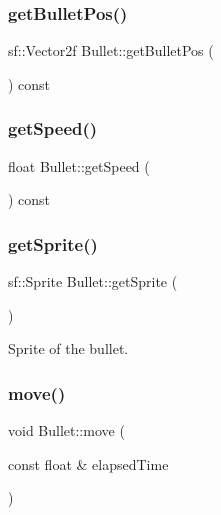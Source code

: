 \subsubsection{\texorpdfstring{get\+Bullet\+Pos()}{getBulletPos()}}
{\footnotesize\ttfamily sf\+::\+Vector2f Bullet\+::get\+Bullet\+Pos (\begin{DoxyParamCaption}{ }\end{DoxyParamCaption}) const\hspace{0.3cm}{\ttfamily [inline]}}

\mbox{\label{class_bullet_ac1d1af57b11dae435ca8d951e85b7079}} 
\subsubsection{\texorpdfstring{get\+Speed()}{getSpeed()}}
{\footnotesize\ttfamily float Bullet\+::get\+Speed (\begin{DoxyParamCaption}{ }\end{DoxyParamCaption}) const\hspace{0.3cm}{\ttfamily [inline]}}

\mbox{\label{class_bullet_aa313bc0e2c9fd200c526cb6fe320462c}} 
\subsubsection{\texorpdfstring{get\+Sprite()}{getSprite()}}
{\footnotesize\ttfamily sf\+::\+Sprite Bullet\+::get\+Sprite (\begin{DoxyParamCaption}{ }\end{DoxyParamCaption})}



Sprite of the bullet. 

\mbox{\label{class_bullet_a1ea29046b26f40abb9f94ca2ccd5d215}} 
\subsubsection{\texorpdfstring{move()}{move()}}
{\footnotesize\ttfamily void Bullet\+::move (\begin{DoxyParamCaption}\item[{const float \&}]{elapsed\+Time }\end{DoxyParamCaption})\hspace{0.3cm}{\ttfamily [private]}}



